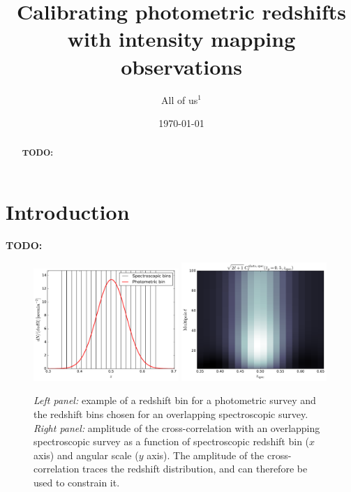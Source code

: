 \documentclass[prd,twocolumn]{revtex4}
\newcommand{\TODO}[1]{{\bf TODO:} \textcolor{red}{#1}}
\begin{document}
\title{Calibrating photometric redshifts with intensity mapping observations}
\author{All of us$^1$}

\begin{abstract}
  \TODO{\lipsum[1]}
\end{abstract}

  \date{\today}
  \maketitle

\section{Introduction}\label{sec:intro}
  \TODO{\lipsum[2]}
  
    \begin{figure}
      \centering
      \includegraphics[width=0.49\textwidth]{bins}
      \includegraphics[width=0.49\textwidth]{xcorr_map}
      \caption{{\sl Left panel:} example of a redshift bin for a photometric survey and the redshift
               bins chosen for an overlapping spectroscopic survey.
               {\sl Right panel:} amplitude of the cross-correlation with an overlapping spectroscopic
               survey as a function of spectroscopic redshift bin ($x$ axis) and angular scale
               ($y$ axis). The amplitude of the cross-correlation traces the redshift distribution,
               and can therefore be used to constrain it.}
      \label{fig:clustred_example}
    \end{figure}
\end{document}
